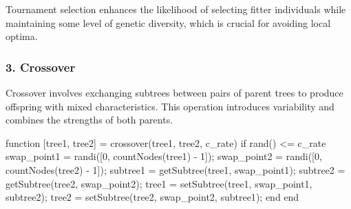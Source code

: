 \documentclass[
  letterpaper,
  DIV=11,
  numbers=noendperiod]{scrartcl}
\newenvironment{Shaded}{\begin{snugshade}}{\end{snugshade}}
\newcommand{\FloatTok}[1]{\textcolor[rgb]{0.68,0.00,0.00}{#1}}
\newcommand{\KeywordTok}[1]{\textcolor[rgb]{0.00,0.23,0.31}{#1}}
\newcommand{\NormalTok}[1]{\textcolor[rgb]{0.00,0.23,0.31}{#1}}
\newcommand{\OperatorTok}[1]{\textcolor[rgb]{0.37,0.37,0.37}{#1}}
\newcommand{\VariableTok}[1]{\textcolor[rgb]{0.07,0.07,0.07}{#1}}
\begin{document}
Tournament selection enhances the likelihood of selecting fitter
individuals while maintaining some level of genetic diversity, which is
crucial for avoiding local optima.

\subsubsection{3. Crossover}\label{crossover}

Crossover involves exchanging subtrees between pairs of parent trees to
produce offspring with mixed characteristics. This operation introduces
variability and combines the strengths of both parents.

\begin{Shaded}
\begin{Highlighting}[]
\KeywordTok{function}\NormalTok{ [}\VariableTok{tree1}\OperatorTok{,} \VariableTok{tree2}\NormalTok{] }\OperatorTok{=} \VariableTok{crossover}\NormalTok{(}\VariableTok{tree1}\OperatorTok{,} \VariableTok{tree2}\OperatorTok{,} \VariableTok{c\_rate}\NormalTok{)}
    \KeywordTok{if} \VariableTok{rand}\NormalTok{() }\OperatorTok{\textless{}=} \VariableTok{c\_rate}
        \VariableTok{swap\_point1} \OperatorTok{=} \VariableTok{randi}\NormalTok{([}\FloatTok{0}\OperatorTok{,} \VariableTok{countNodes}\NormalTok{(}\VariableTok{tree1}\NormalTok{) }\OperatorTok{{-}} \FloatTok{1}\NormalTok{])}\OperatorTok{;}
        \VariableTok{swap\_point2} \OperatorTok{=} \VariableTok{randi}\NormalTok{([}\FloatTok{0}\OperatorTok{,} \VariableTok{countNodes}\NormalTok{(}\VariableTok{tree2}\NormalTok{) }\OperatorTok{{-}} \FloatTok{1}\NormalTok{])}\OperatorTok{;}
        \VariableTok{subtree1} \OperatorTok{=} \VariableTok{getSubtree}\NormalTok{(}\VariableTok{tree1}\OperatorTok{,} \VariableTok{swap\_point1}\NormalTok{)}\OperatorTok{;}
        \VariableTok{subtree2} \OperatorTok{=} \VariableTok{getSubtree}\NormalTok{(}\VariableTok{tree2}\OperatorTok{,} \VariableTok{swap\_point2}\NormalTok{)}\OperatorTok{;}
        \VariableTok{tree1} \OperatorTok{=} \VariableTok{setSubtree}\NormalTok{(}\VariableTok{tree1}\OperatorTok{,} \VariableTok{swap\_point1}\OperatorTok{,} \VariableTok{subtree2}\NormalTok{)}\OperatorTok{;}
        \VariableTok{tree2} \OperatorTok{=} \VariableTok{setSubtree}\NormalTok{(}\VariableTok{tree2}\OperatorTok{,} \VariableTok{swap\_point2}\OperatorTok{,} \VariableTok{subtree1}\NormalTok{)}\OperatorTok{;}
    \KeywordTok{end}
\KeywordTok{end}
\end{Highlighting}
\end{Shaded}
\end{document}
